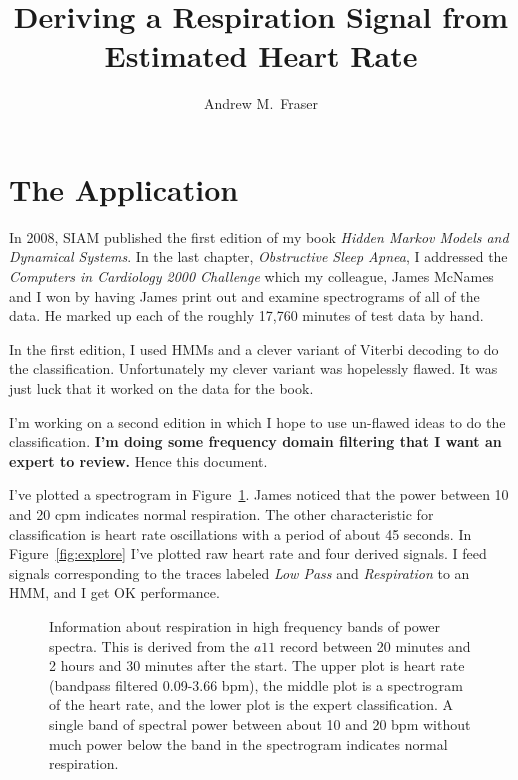 \documentclass[twocolumn]{article}
\title{Deriving a Respiration Signal from Estimated Heart Rate}
\author{Andrew M.\ Fraser}
\begin{document}
\maketitle

\section{The Application}
\label{sec:application}

In 2008, SIAM published the first edition of my book \emph{Hidden
Markov Models and Dynamical Systems}.  In the last chapter,
\emph{Obstructive Sleep Apnea}, I addressed the \emph{Computers in
Cardiology 2000 Challenge} which my colleague, James McNames and I won
by having James print out and examine spectrograms of all of the data.
He marked up each of the roughly 17,760 minutes of test data by hand.

In the first edition, I used HMMs and a clever variant of Viterbi
decoding to do the classification.  Unfortunately my clever variant
was hopelessly flawed.  It was just luck that it worked on the data
for the book.

I'm working on a second edition in which I hope to use un-flawed ideas
to do the classification.  \textbf{I'm doing some frequency domain
  filtering that I want an expert to review.}  Hence this document.

I've plotted a spectrogram in Figure~\ref{fig:sgram}.  James noticed
that the power between 10 and 20 cpm indicates normal respiration.
The other characteristic for classification is heart rate oscillations
with a period of about 45 seconds.  In Figure~\ref{fig:explore} I've
plotted raw heart rate and four derived signals.  I feed signals
corresponding to the traces labeled \emph{Low Pass} and
\emph{Respiration} to an HMM, and I get OK performance.

\begin{figure}
  \caption[Information about respiration in high
  frequency phase variations]
  {Information about respiration in high frequency bands of power
    spectra.  This is derived from the $a11$ record between 20 minutes
    and 2 hours and 30 minutes after the start.  The upper plot is
    heart rate (bandpass filtered 0.09-3.66 bpm), the middle plot is a
    spectrogram of the heart rate, and the lower plot is the expert
    classification.  A single band of spectral power between about 10
    and 20 bpm without much power below the band in the spectrogram
    indicates normal respiration.}
  \label{fig:sgram}
\end{figure}
\end{document}
